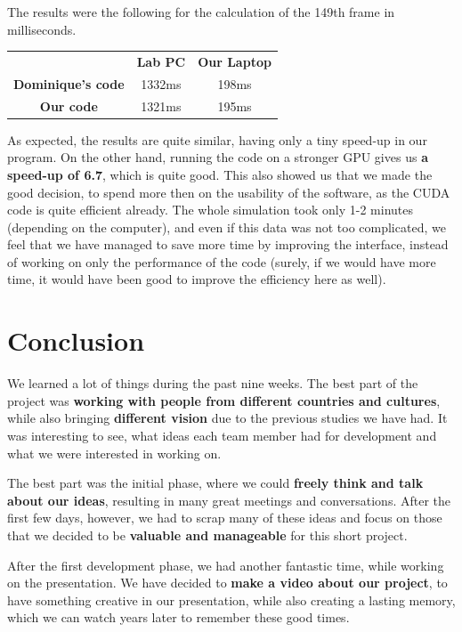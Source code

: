 \documentclass[a4paper, 11pt, article]{report}
\begin{document}
The results were the following for the calculation of the 149th frame in milliseconds.

\begin{center}
\begin{tabular}{ c c c }
 & \textbf{Lab PC} & \textbf{Our Laptop} \\
 \textbf{Dominique's code} & 1332ms & 198ms \\ 
 \textbf{Our code} & 1321ms & 195ms   
\end{tabular}
\end{center}

As expected, the results are quite similar, having only a tiny speed-up in our program. On the other hand, running the code on a stronger GPU gives us \textbf{a speed-up of 6.7}, which is quite good. This also showed us that we made the good decision, to spend more then on the usability of the software, as the CUDA code is quite efficient already. The whole simulation took only 1-2 minutes (depending on the computer), and even if this data was not too complicated, we feel that we have managed to save more time by improving the interface, instead of working on only the performance of the code (surely, if we would have more time, it would have been good to improve the efficiency here as well).


\chapter{Conclusion}

We learned a lot of things during the past nine weeks. The best part of the project was \textbf{working with people from different countries and cultures}, while also bringing \textbf{different vision} due to the previous studies we have had. It was interesting to see, what ideas each team member had for development and what we were interested in working on.

The best part was the initial phase, where we could \textbf{freely think and talk about our ideas}, resulting in many great meetings and conversations. After the first few days, however, we had to scrap many of these ideas and focus on those that we decided to be \textbf{valuable and manageable} for this short project.

After the first development phase, we had another fantastic time, while working on the presentation. We have decided to \textbf{make a video about our project}, to have something creative in our presentation, while also creating a lasting memory, which we can watch years later to remember these good times.
\end{document}
